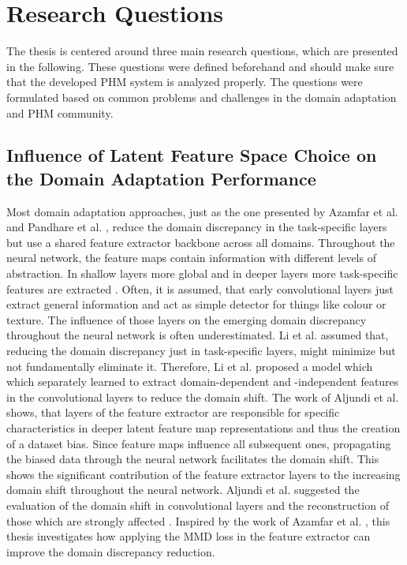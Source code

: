 \chapter{Research Questions}\label{chapter:research_approach}
The thesis is centered around three main research questions, which are presented in the following. These questions were defined beforehand and should make sure that the developed PHM system is analyzed properly. The questions were formulated based on common problems and challenges in the domain adaptation and PHM community. 

\section{Influence of Latent Feature Space Choice on the Domain Adaptation Performance}
Most domain adaptation approaches, just as the one presented by Azamfar et al. \cite{AZAMFAR2020103932} and Pandhare et al. \cite{Pandhare2021}, reduce the domain discrepancy in the task-specific layers but use a shared feature extractor backbone across all domains. Throughout the neural network, the feature maps contain information with different levels of abstraction. In shallow layers more global and in deeper layers more task-specific features are extracted \cite{Aljundi2016}. Often, it is assumed, that early convolutional layers just extract general information and act as simple detector for things like colour or texture. The influence of those layers on the emerging domain discrepancy throughout the neural network is often underestimated. Li et al. \cite{li2020} assumed that, reducing the domain discrepancy just in task-specific layers, might minimize but not fundamentally eliminate it. Therefore, Li et al. \cite{li2020} proposed a model which which separately learned to extract domain-dependent and -independent features in the convolutional layers to reduce the domain shift. The work of Aljundi et al. \cite{Aljundi2016} shows, that layers of the feature extractor are responsible for specific characteristics in deeper latent feature map representations and thus the creation of a dataset bias. Since feature maps influence all subsequent ones, propagating the biased data through the neural network facilitates the domain shift. This shows the significant contribution of the feature extractor layers to the increasing domain shift throughout the neural network. Aljundi et al. suggested the evaluation of the domain shift in convolutional layers and the reconstruction of those which are strongly affected \cite{Aljundi2016}. Inspired by the work of Azamfar et al. \cite{Aljundi2016}, this thesis investigates how applying the MMD loss in the feature extractor can improve the domain discrepancy reduction.


